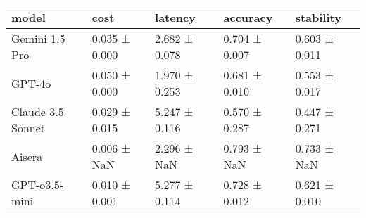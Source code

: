\begin{tabular}{lllll}
\toprule
model & cost & latency & accuracy & stability \\
\midrule
Gemini 1.5 Pro & 0.035 ± 0.000 & 2.682 ± 0.078 & 0.704 ± 0.007 & 0.603 ± 0.011 \\
GPT-4o & 0.050 ± 0.000 & 1.970 ± 0.253 & 0.681 ± 0.010 & 0.553 ± 0.017 \\
Claude 3.5 Sonnet & 0.029 ± 0.015 & 5.247 ± 0.116 & 0.570 ± 0.287 & 0.447 ± 0.271 \\
Aisera & 0.006 ± NaN & 2.296 ± NaN & 0.793 ± NaN & 0.733 ± NaN \\
GPT-o3.5-mini & 0.010 ± 0.001 & 5.277 ± 0.114 & 0.728 ± 0.012 & 0.621 ± 0.010 \\
\bottomrule
\end{tabular}
